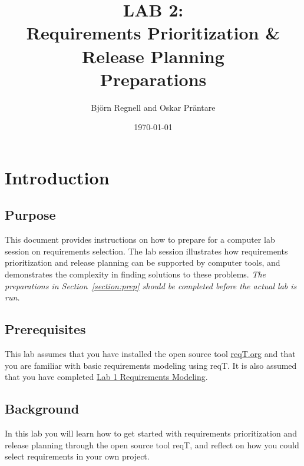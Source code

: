 \documentclass[11pt]{article}
\title{{\bf LAB 2:\\Requirements Prioritization \& Release Planning}\\ Preparations %
}
\author{Björn Regnell and Oskar Präntare}
\date{\today}
\begin{document}
\maketitle

\section{Introduction}

\subsection{Purpose} This document provides instructions on how to prepare for 
a computer lab session on requirements selection. The lab session illustrates how requirements prioritization and release planning can be supported by computer tools, and demonstrates the complexity in finding solutions to these problems. {\it The preparations in Section~\ref{section:prep} should be completed before the actual lab is run.} 

\subsection{Prerequisites} This lab assumes that you have installed the open source tool \href{http://reqT.org}{reqT.org} and that you are familiar with basic requirements modeling using reqT. It is also assumed that you have completed \href{https://github.com/reqT/reqT/raw/3.0.x/doc/lab1/lab1.pdf}{Lab 1 Requirements Modeling}.

\subsection{Background} In this lab you will learn how to get started with requirements prioritization and release planning through the open source tool reqT, and reflect on how you could select requirements in your own project. 
\end{document}
